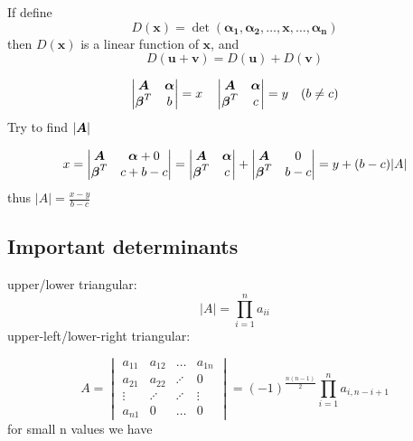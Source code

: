 \documentclass{overview}
\begin{document}
If define
\[
	D(\boldsymbol{x}) =
	\det(\boldsymbol{\alpha_1}, \boldsymbol{\alpha_2}, \dots, \boldsymbol{x}, \dots, \boldsymbol{\alpha_n})
\] 
then $D(\boldsymbol{x})$ is a linear function of $\boldsymbol{x}$, and
\[
	D(\boldsymbol{u}+\boldsymbol{v}) = D(\boldsymbol{u}) + D(\boldsymbol{v})
\] 
\begin{example}
	\[
	\begin{vmatrix}
		\boldsymbol{A} & \boldsymbol{\alpha} \\
		\boldsymbol{\beta}^{T} & b \\
	\end{vmatrix}=x
	\quad
	\begin{vmatrix}
		\boldsymbol{A} & \boldsymbol{\alpha} \\
		\boldsymbol{\beta}^{T} & c \\
	\end{vmatrix}
	=y
	\quad (b \ne c)
	\] 
	Try to find $|\boldsymbol{A}|$
	 \begin{answer}
		 \[
		 x=\begin{vmatrix}
			 \boldsymbol{A} & \boldsymbol{\alpha}+0 \\
			 \boldsymbol{\beta}^{T} & c+b-c \\
		 \end{vmatrix}
		 =\begin{vmatrix}
			 \boldsymbol{A} & \boldsymbol{\alpha} \\
			 \boldsymbol{\beta}^{T} & c \\
		 \end{vmatrix}
		 +\begin{vmatrix}
			 \boldsymbol{A} & 0 \\
			 \boldsymbol{\beta}^{T} & b-c \\
	 \end{vmatrix}
	 = y + (b-c)|A|
		 \] 
		 thus $|A|=\frac{x-y}{b-c}$
	\end{answer}
\end{example}

\subsection{Important determinants}

upper/lower triangular:
\[
	|A| = \prod_{i=1}^{n} a_{ii}
\]
upper-left/lower-right triangular:

\[
A=
\begin{vmatrix}
	a_{11} & a_{12} & \dots & a_{1n} \\
	a_{21} & a_{22} & \iddots & 0\\
	\vdots & \iddots & \iddots & \vdots \\
	a_{n1} & 0 & \dots & 0
\end{vmatrix}
= (-1)^{\frac{n(n-1)}{2}}\prod_{i=1}^{n} a_{i, n-i+1}
\]
for small n values we have
\end{document}
